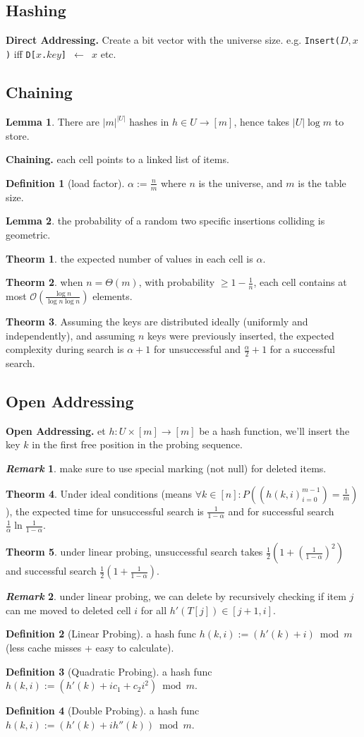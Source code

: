 \documentclass[]{article}
\newcommand\compactsubsection[1]        {\vspace{-10pt}\subsection{#1}\vspace{-6pt}}
\newcommand\compactsection   [1]        {\vspace{-10pt}\section{#1}\vspace{-6pt}}
\newcommand\subsectionrightaftersection {\vspace{10pt}}
\theoremstyle{definition}
\newtheorem{Theorem}{\color{theoColor}Theorm}
\newtheorem{Definition}{\color{defiColor}Definition}
\newtheorem{Lemma}{\color{lemColor}Lemma}
\newtheorem{Remark}{\textit{Remark}}
\newcommand\theo  [1] {\begin{Theorem}#1\end{Theorem}}
\newcommand\lem   [1] {\begin{Lemma}#1\end{Lemma}}
\newcommand\oc    {\mathcal{O}}
\newcommand\set   {\ell et \text{ }}
\newcommand\co        {\colon}
\newcommand\ag        {\alpha}
\newcommand\logn      {\log n}
\newcommand\cl [1]    {\left ( #1 \right )}
\begin{document}
\begin{multicols}{4}
		
		\compactsection{Hashing}\subsectionrightaftersection
			\textbf{Direct Addressing. }Create a bit vector with the universe size. e.g. \texttt{Insert($D, x$)} iff \texttt{D[$x$.$key$] $\gets$ $x$} etc. 
			\compactsubsection{Chaining}
				\lem{There are $|m|^{|U|}$ hashes in $h \in U \to [m]$, hence takes $|U|\log m$ to store. }
				\textbf{Chaining. }each cell points to a linked list of items. 
				\begin{Definition}[load factor]
					$\ag := \frac{n}{m}$ where $n$ is the universe, and $m$ is the table size. 
				\end{Definition}
				\lem{the probability of a random two specific insertions colliding is geometric. }
				\theo{the expected number of values in each cell is $\ag$. }
				\theo{when $n = \Theta(m)$, with probability $\ge 1 - \frac{1}{n}$, each cell contains at most $\oc\cl{\frac{\logn}{\logn\logn}}$ elements. }
				\theo{Assuming the keys are distributed ideally (uniformly and independently), and assuming $n$ keys were previously inserted, the expected complexity during search is $\ag + 1$ for unsuccessful and $\frac{\ag}{2} + 1$ for a successful search. }
			
			\compactsubsection{Open Addressing}
				\textbf{Open Addressing. }\set $h \co U \times [m] \to [m]$ be a hash function, we'll insert the key $k$ in the first free position in the probing sequence. 
				
				\begin{Remark}
					make sure to use special marking (not null) for deleted items.  
				\end{Remark}
				
				\theo{Under ideal conditions (means $\forall k \in [n] \co P\cl{(h(k, i)_{i = 0}^{m - 1}) = \frac{1}{m}}$), the expected time for unsuccessful search is $\frac{1}{1 - \ag}$ and for successful search $\frac{1}{\ag} \ln \frac{1}{1 - \ag}$. } 
				
				\theo{under linear probing, unsuccessful search takes $\frac{1}{2}\cl{1 + \cl{\frac{1}{1 - \ag}}^2}$ and successful search $\frac{1}{2}\cl{1 + \frac{1}{1 - \ag}}$. }
				\begin{Remark}
					under linear probing, we can delete by recursively checking if item $j$ can me moved to deleted cell $i$ for all $h'(T[j]) \in [j + 1, i]$. 
				\end{Remark}
				
				\begin{Definition}[Linear Probing]
				 	a hash func $h(k, i) := (h'(k) + i) \bmod m$ (less cache misses + easy to calculate). 
				\end{Definition}
				\begin{Definition}[Quadratic Probing]
					a hash func $h(k, i) := (h'(k) + ic_1 + c_2i^2) \bmod m$. 
				\end{Definition}
				\begin{Definition}[Double Probing]
					a hash func $h(k, i) := (h'(k) + ih''(k)) \bmod m$. 
				\end{Definition}
			

\end{multicols}
\end{document}
